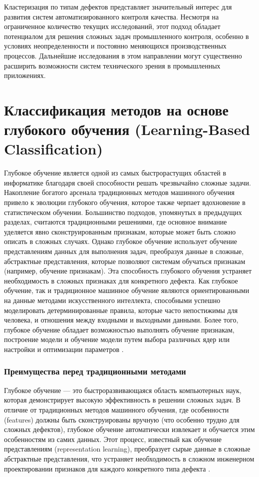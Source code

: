 \documentclass[14pt,a4paper]{article}
\begin{document}
Кластеризация по типам дефектов представляет значительный интерес для развития систем автоматизированного контроля качества. Несмотря на ограниченное количество текущих исследований, этот подход обладает потенциалом для решения сложных задач промышленного контроля, особенно в условиях неопределенности и постоянно меняющихся производственных процессов. Дальнейшие исследования в этом направлении могут существенно расширить возможности систем технического зрения в промышленных приложениях.

\section{Классификация методов на основе глубокого обучения (Learning-Based Classification)}
Глубокое обучение является одной из самых быстрорастущих областей в информатике благодаря своей способности решать чрезвычайно сложные задачи. Накопление богатого арсенала традиционных методов машинного обучения привело к эволюции глубокого обучения, которое также черпает вдохновение в статистическом обучении. Большинство подходов, упомянутых в предыдущих разделах, считаются традиционными решениями, где основное внимание уделяется явно сконструированным признакам, которые может быть сложно описать в сложных случаях. Однако глубокое обучение использует обучение представлениям данных для выполнения задач, преобразуя данные в сложные, абстрактные представления, которые позволяют системам обучаться признакам (например, обучение признакам). Эта способность глубокого обучения устраняет необходимость в сложных признаках для конкретного дефекта. Как глубокое обучение, так и традиционное машинное обучение являются ориентированными на данные методами искусственного интеллекта, способными успешно моделировать детерминированные правила, которые часто непостижимы для человека, и отношения между входными и выходными данными. Более того, глубокое обучение обладает возможностью выполнять обучение признакам, построение модели и обучение модели путем выбора различных ядер или настройки и оптимизации параметров \cite{Czimmermann2020}.

\subsubsection*{Преимущества перед традиционными методами}

Глубокое обучение — это быстроразвивающаяся область компьютерных наук, которая демонстрирует высокую эффективность в решении сложных задач. В отличие от традиционных методов машинного обучения, где особенности (features) должны быть сконструированы вручную (что особенно трудно для сложных дефектов), глубокое обучение автоматически извлекает и обучается этим особенностям из самих данных. Этот процесс, известный как обучение представлениям (representation learning), преобразует сырые данные в сложные абстрактные представления, что устраняет необходимость в сложном инженерном проектировании признаков для каждого конкретного типа дефекта \cite{Czimmermann2020}.
\end{document}
